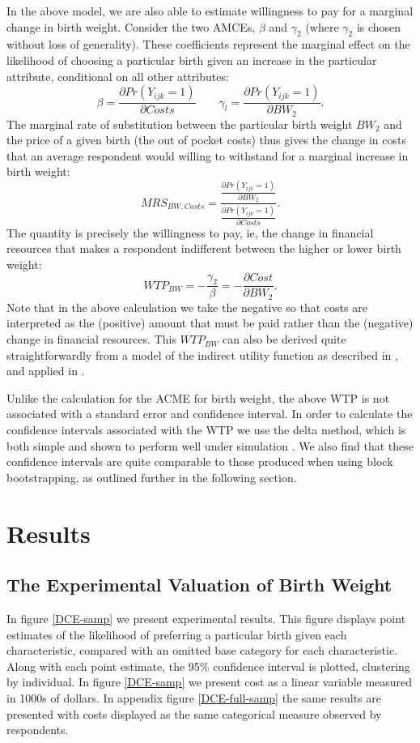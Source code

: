 \documentclass[a4paper, 11pt]{article}
\begin{document}
\begin{spacing}{1.4}
In the above model, we are also able to estimate willingness to pay for a
marginal change in birth weight.  Consider the two AMCEs, $\beta$ and $\gamma_2$
(where $\gamma_2$ is chosen without loss of generality).  These coefficients
represent the marginal effect on the likelihood of choosing a particular birth
given an increase in the particular attribute, conditional on all other
attributes:
\[
\beta=\frac{\partial Pr(Y_{ijk}=1)}{\partial Costs} \qquad \gamma_l=\frac{\partial Pr(Y_{ijk}=1)}{\partial BW_2}.
\]
The marginal rate of substitution between the particular birth weight $BW_2$
and the price of a given birth (the out of pocket costs) thus gives the change
in costs that an average respondent would willing to withstand for a marginal
increase in birth weight:
\[
MRS_{BW,Costs}=\frac{\frac{\partial Pr(Y_{ijk}=1)}{\partial BW_2}}{\frac{\partial Pr(Y_{ijk}=1)}{\partial Costs}}.
\]
The quantity is precisely the willingness to pay, ie, the change in financial
resources that makes a respondent indifferent between the higher or lower birth
weight:
\[
WTP_{BW}=-\frac{\gamma_2}{\beta}=-\frac{\partial Cost}{\partial BW_2}.
\]
Note that in the above calculation we take the negative so that costs are
interpreted as the (positive) amount that must be paid rather than the
(negative) change in financial resources.  This $WTP_{BW}$ can also be
derived quite straightforwardly from a model of the indirect utility
function as described in \citet{Zweifeletal2009}, and applied in
\citet{Clarkeetal2016}.

Unlike the calculation for the ACME for birth weight, the above WTP
is not associated with a standard error and confidence interval.  In
order to calculate the confidence intervals associated with the WTP
we use the delta method, which is both simple and shown to perform
well under simulation \citep{Hole2007}.  We also find that these
confidence intervals are quite comparable to those produced when using
block bootstrapping, as outlined further in the following section. 

\section{Results}
\label{scn:results}
\subsection{The Experimental Valuation of Birth Weight}
\label{sscn:expR}
In figure \ref{DCE-samp} we present experimental results.  This figure
displays point estimates of the likelihood of preferring a particular
birth given each characteristic, compared with an omitted base category
for each characteristic.  Along with each point estimate, the 95\%
confidence interval is plotted, clustering by individual.  In figure
\ref{DCE-samp} we present cost as a linear variable measured in 1000s of
dollars.  In appendix figure \ref{DCE-full-samp} the same results are
presented with costs displayed as the same categorical measure observed
by respondents.


\end{spacing}
\end{document}
